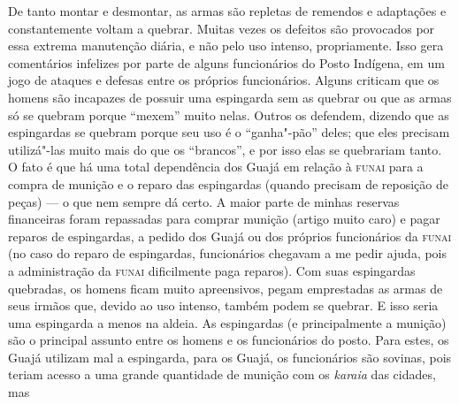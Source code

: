 De tanto montar e desmontar, as armas são repletas de remendos e
adaptações e constantemente voltam a quebrar. Muitas vezes os defeitos
são provocados por essa extrema manutenção diária, e não pelo uso
intenso, propriamente. Isso gera comentários infelizes por parte de
alguns funcionários do Posto Indígena, em um jogo de ataques e defesas
entre os próprios funcionários. Alguns criticam que os homens são
incapazes de possuir uma espingarda sem as quebrar ou que as armas só se
quebram porque ``mexem'' muito nelas. Outros os defendem, dizendo que as
espingardas se quebram porque seu uso é o ``ganha"-pão'' deles; que eles
precisam utilizá"-las muito mais do que os ``brancos'', e por isso elas se
quebrariam tanto. O fato é que há uma total dependência dos Guajá em
relação à \textsc{funai} para a compra de munição e o reparo das espingardas
(quando precisam de reposição de peças) --- o que nem sempre dá certo. A
maior parte de minhas reservas financeiras foram repassadas para comprar
munição (artigo muito caro) e pagar reparos de espingardas, a pedido dos
Guajá ou dos próprios funcionários da \textsc{funai} (no caso do reparo de
espingardas, funcionários chegavam a me pedir ajuda, pois a
administração da \textsc{funai} dificilmente paga reparos). Com suas espingardas
quebradas, os homens ficam muito apreensivos, pegam emprestadas as armas
de seus irmãos que, devido ao uso intenso, também podem se quebrar. E
isso seria uma espingarda a menos na aldeia. As espingardas (e
principalmente a munição) são o principal assunto entre os homens e os
funcionários do posto. Para estes, os Guajá utilizam mal a espingarda,
para os Guajá, os funcionários são sovinas, pois teriam acesso a uma
grande quantidade de munição com os \emph{karaia} das cidades, mas
